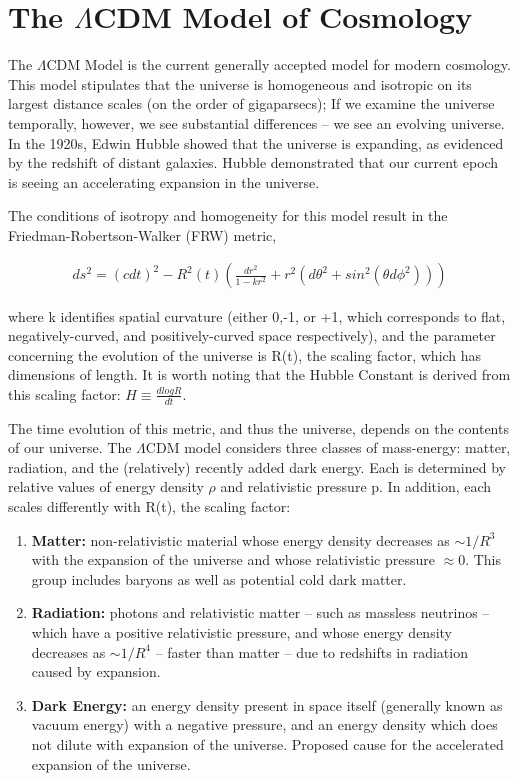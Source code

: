 \documentclass{report}
\begin{document}
\section{The $\Lambda$CDM Model of Cosmology}

The $\Lambda$CDM Model is the current generally accepted model for modern cosmology. This model stipulates that the universe is homogeneous and isotropic on its largest distance scales (on the order of gigaparsecs); If we examine the universe temporally, however, we see substantial differences -- we see an evolving universe. In the 1920s, Edwin Hubble showed that the universe is expanding, as evidenced by the redshift of distant galaxies. Hubble demonstrated that our current epoch is seeing an accelerating expansion in the universe.

The conditions of isotropy and homogeneity for this model result in the Friedman-Robertson-Walker (FRW) metric,

\begin{eqnarray}
ds^2 = (cdt)^2 - R^2(t)\left(\frac{dr^2}{1-kr^2} + r^2(d\theta^2 + sin^2(\theta d \phi^2))\right)
\end{eqnarray}

where k identifies spatial curvature (either 0,-1, or +1, which corresponds to flat, negatively-curved, and positively-curved space respectively), and the parameter concerning the evolution of the universe is R(t), the scaling factor, which has dimensions of length. It is worth noting that the Hubble Constant is derived from this scaling factor: $H \equiv \frac{d log R}{dt}$.

The time evolution of this metric, and thus the universe, depends on the contents of our universe. The $\Lambda$CDM model considers three classes of mass-energy: matter, radiation, and the (relatively) recently added dark energy. Each is determined by relative values of energy density $\rho$ and relativistic pressure p. In addition, each scales differently with R(t), the scaling factor:

\begin{enumerate}
\item \textbf{Matter:} non-relativistic material whose energy density decreases as $\sim 1/R^3$ with the expansion of the universe and whose relativistic pressure $\approx 0$. This group includes baryons as well as potential cold dark matter.
\item \textbf{Radiation:} photons and relativistic matter -- such as massless neutrinos -- which have a positive relativistic pressure, and whose energy density decreases as $\sim 1/R^4$ -- faster than matter -- due to redshifts in radiation caused by expansion.
\item \textbf{Dark Energy:} an energy density present in space itself (generally known as vacuum energy) with a negative pressure, and an energy density which does not dilute with expansion of the universe. Proposed cause for the accelerated expansion of the universe.
\end{enumerate}
\end{document}

